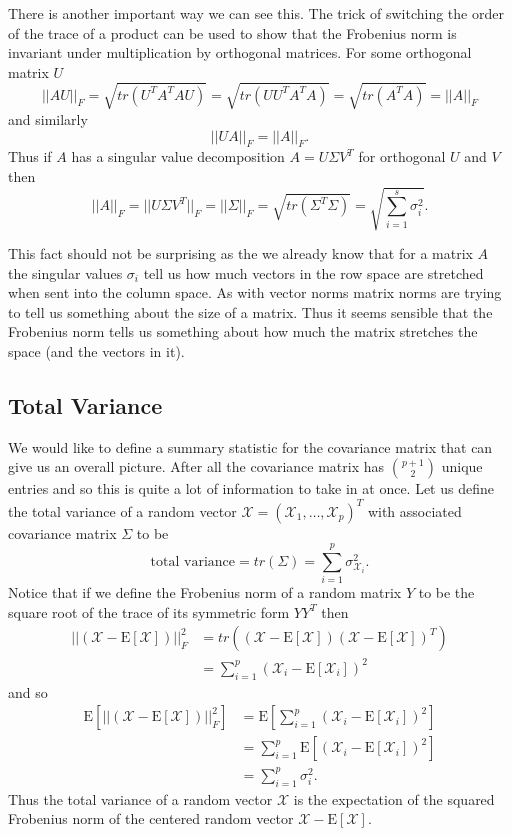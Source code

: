 \documentclass{book}
\newcommand{\bs}[1]{\boldsymbol{#1}}
\newcommand{\rv}[1]{\bs{\mathscr{#1}}}
\newcommand{\e}[1]{\text{E}\left[#1\right]}
\begin{document}
There is another important way we can see this. The trick of switching the order of the trace of a product can be used to show that the Frobenius norm is invariant under multiplication by orthogonal matrices. For some orthogonal matrix $U$
$$
||AU||_F=\sqrt{tr(U^TA^TAU)}=\sqrt{tr(UU^TA^TA)}=\sqrt{tr(A^TA)}=||A||_F
$$
and similarly
$$
||UA||_F=||A||_F.
$$
Thus if $A$ has a singular value decomposition $A=U\Sigma V^T$ for orthogonal $U$ and $V$ then
$$
||A||_F=||U\Sigma V^T||_F=||\Sigma||_F=\sqrt{tr(\Sigma^T\Sigma)}=\sqrt{\sum_{i=1}^{s}\sigma_i^2}.
$$

This fact should not be surprising as the we already know that for a matrix $A$ the singular values $\sigma_i$ tell us how much vectors in the row space are stretched when sent into the column space. As with vector norms matrix norms are trying to tell us something about the size of a matrix. Thus it seems sensible that the Frobenius norm tells us something about how much the matrix stretches the space (and the vectors in it).

\subsection{Total Variance}
We would like to define a summary statistic for the covariance matrix that can give us an overall picture. After all the covariance matrix has $\binom{p+1}{2}$ unique entries and so this is quite a lot of information to take in at once. Let us define the total variance of a random vector $\rv{X}=(\mathscr{X}_1,\ldots,\mathscr{X}_p)^T$ with associated covariance matrix $\Sigma$ to be
$$
\text{total variance}=tr(\Sigma)=\sum_{i=1}^{p}\sigma_{\mathscr{X}_i}^2.
$$
Notice that if we define the Frobenius norm of a random matrix $Y$ to be the square root of the trace of its symmetric form $YY^T$ then
$$
\begin{aligned}
||(\rv{X}-\e{\rv{X}})||_F^2&=tr\left((\rv{X}-\e{\rv{X}})(\rv{X}-\e{\rv{X}})^T\right)\\
&=\sum_{i=1}^{p}(\mathscr{X}_i-\e{\mathscr{X}_i})^2
\end{aligned}
$$
and so 
$$
\begin{aligned}
\e{||(\rv{X}-\e{\rv{X}})||_F^2}&=\e{\sum_{i=1}^{p}(\mathscr{X}_i-\e{\mathscr{X}_i})^2}\\
&=\sum_{i=1}^{p}\e{(\mathscr{X}_i-\e{\mathscr{X}_i})^2}\\
&=\sum_{i=1}^{p}\sigma_i^2.
\end{aligned}
$$
Thus the total variance of a random vector $\rv{X}$ is the expectation of the squared Frobenius norm of the centered random vector $\rv{X}-\e{\rv{X}}$.
\end{document}
